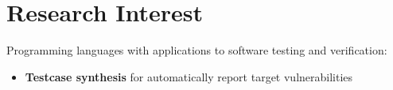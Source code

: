 \section{Research Interest}
Programming languages with applications to software testing and verification:

\renewcommand{\labelitemi}{$\blacktriangleright$}
\addtolength{\leftmargini}{0.3cm}

\begin{itemize}
\vspace{0.15cm}
\item \textbf{Testcase synthesis} for automatically report target vulnerabilities
\end{itemize}

\vspace{8mm}